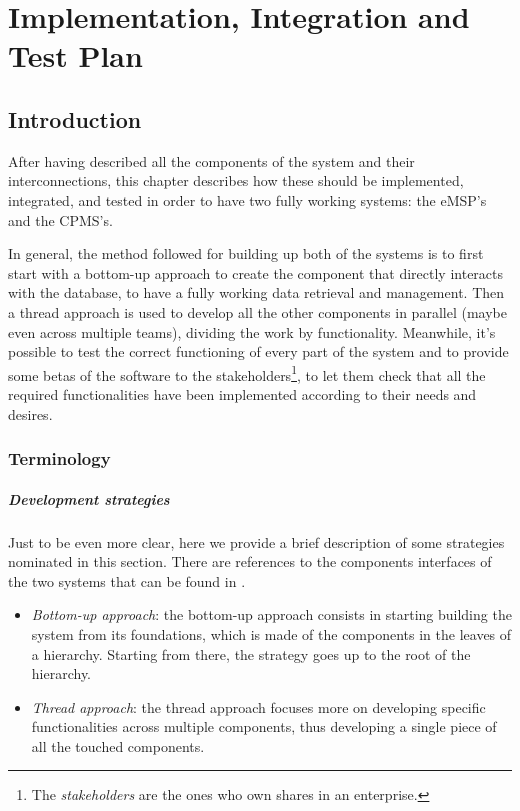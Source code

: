 \chapter{Implementation, Integration and Test Plan} \label{iitp}

\section{Introduction}

After having described all the components of the system and their interconnections, this chapter describes how these should be implemented, integrated, and tested in order to have two fully working systems: the eMSP's and the CPMS's.\medskip

In general, the method followed for building up both of the systems is to first start with a bottom-up approach to create the component that directly interacts with the database, to have a fully working data retrieval and management. Then a thread approach is used to develop all the other components in parallel (maybe even across multiple teams), dividing the work by functionality. Meanwhile, it's possible to test the correct functioning of every part of the system and to provide some betas of the software to the stakeholders\footnote{The \textit{stakeholders} are the ones who own shares in an enterprise.}, to let them check that all the required functionalities have been implemented according to their needs and desires.

\subsection{Terminology}

\paragraph{Development strategies} Just to be even more clear, here we provide a brief description of some strategies nominated in this section. There are references to the components interfaces of the two systems that can be found in .
\begin{itemize}
    \item \textit{Bottom-up approach}: the bottom-up approach consists in starting building the system from its foundations, which is made of the components in the leaves of a  hierarchy. Starting from there, the strategy goes up to the root of the hierarchy.
    \item \textit{Thread approach}: the thread approach focuses more on developing specific functionalities across multiple components, thus developing a single piece of all the touched components.
\end{itemize}

